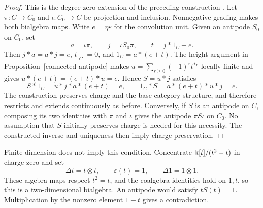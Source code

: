\begin{proof}
This is the degree-zero extension of the preceding construction
\cite[Exercise 1.4.31(b), p.~19]{GrinbergReiner}.
Let $\pi:C\to C_0$ and $\iota:C_0\to C$ be projection and inclusion.
Nonnegative grading makes both bialgebra maps.
Write $e=\eta\varepsilon$ for the convolution unit.
Given an antipode $S_0$ on $C_0$, set
\[
 a=\iota\pi,\qquad j=\iota S_0\pi,\qquad
 t=j*1_C-e.
\]
Then $j*a=a*j=e$, $t|_{C_0}=0$, and $1_C=a*(e+t)$.
The height argument in Proposition~\ref{connected-antipode} makes
$u=\sum_{r\geq0}(-1)^rt^{*r}$ locally finite and gives
$u*(e+t)=(e+t)*u=e$.  Hence $S=u*j$ satisfies
\[
 S*1_C=u*j*a*(e+t)=e,\qquad
 1_C*S=a*(e+t)*u*j=e.
\]
The construction preserves charge and the base-category structure, and
therefore restricts and extends continuously as before.
Conversely, if $S$ is an antipode on $C$, composing its two identities
with $\pi$ and $\iota$ gives the antipode $\pi S\iota$ on $C_0$.
No assumption that $S$ initially preserves charge is needed for this
necessity.  The constructed inverse and uniqueness then imply charge
preservation.
\end{proof}

Finite dimension does not imply this condition.  Concentrate
$\Bbbk[t]/(t^2-t)$ in charge zero and set
\[
 \Delta t=t\otimes t,\qquad\varepsilon(t)=1,\qquad\Delta1=1\otimes1.
\]
These algebra maps respect $t^2=t$, and the coalgebra identities hold
on $1,t$, so this is a two-dimensional bialgebra.
An antipode would satisfy $tS(t)=1$.
Multiplication by the nonzero element $1-t$ gives a contradiction.
